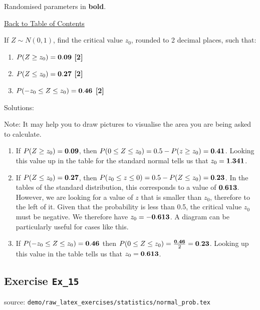 \documentclass[a4paper, leqno, 12pt]{report}
\newenvironment{top_enumerate}{
\begin{enumerate}
  \setlength{\itemsep}{2em}
  \setlength{\topsep}{-0pt}
  \setlength{\partopsep}{-0pt}
}{\end{enumerate}}
\begin{document}
Randomised parameters in \textbf{bold}. 

\hyperlink{contents}{Back to Table of Contents}
\begin{top_enumerate}
\item If $Z \sim N(0,1)$, find the critical value $z_0$, rounded to 2 decimal places, such that:
 
\setcounter{equation}{0}  %
\begin{enumerate}
	\setlength{\topsep}{-0pt}
	\setlength{\partopsep}{-0pt}
	\setlength{\itemsep}{10pt}
			\item $P(Z \ge z_0) = {\bf 0.09}$
	 \quad \textbf{[2]}
		\item $P(Z \le z_0) = {\bf 0.27}$
	 \quad \textbf{[2]}
		\item $P(-z_0 \le Z \le z_0) = {\bf 0.46}$
	 \quad \textbf{[2]}
\end{enumerate}\addtocounter{enumi}{-1}
\item Solutions:

Note: It may help you to draw pictures to visualise the area you are being asked to calculate.
 
\setcounter{equation}{0}  %
\begin{enumerate}
	\setlength{\topsep}{-0pt}
	\setlength{\partopsep}{-0pt}
	\setlength{\itemsep}{10pt}
			\item If $P(Z \ge z_0) = {\bf 0.09}$, then $P(0 \le Z \le z_0)  = 0.5 - P(z \ge z_0) = {\bf 0.41}$. Looking this value up in the table for the standard normal tells us that $z_0 = {\bf 1.341}$.
	 \quad \textbf{}
		\item If $P(Z \le z_0) = {\bf 0.27}$, then $P(z_0 \le z \le 0) = 0.5 - P(Z \le z_0) = {\bf 0.23}$. In the tables of the standard distribution, this corresponds to a value of ${\bf 0.613}$. However, we are looking for a value of $z$ that is smaller than $z_0$, therefore to the left of it. Given that the probability is less than 0.5, the critical value $z_0$ must be negative. We therefore have $z_0 = -{\bf 0.613}$. A diagram can be particularly useful for cases like this.
	 \quad \textbf{}
		\item If $P(-z_0 \le Z \le z_0) = {\bf 0.46}$ then $P(0 \le Z \le z_0) = \frac{{\bf 0.46}}{2} = {\bf 0.23}$. Looking up this value in the table tells us that $z_0 = {\bf 0.613}$.
	 \quad \textbf{}
\end{enumerate}\newpage
\end{top_enumerate}
\subsection{Exercise \texttt{Ex\_15}}
source: \texttt{demo/raw\_latex\_exercises/statistics/normal\_prob.tex}
\end{document}
